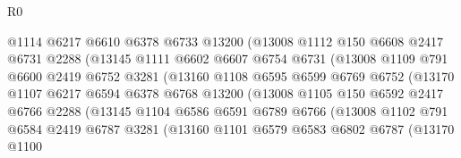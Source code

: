 \begin{lexlean}{R0}
\begin{coremodule}
                        @1114
                        @6217
                        @6610
                        @6378
                        @6733
                        @13200
                        (@13008
                          @1112
                          @150
                          @6608
                          @2417
                          @6731
                          @2288
                          (@13145
                            @1111
                            @6602
                            @6607
                            @6754
                            @6731
                            (@13008
                              @1109
                              @791
                              @6600
                              @2419
                              @6752
                              @3281
                              (@13160
                                @1108
                                @6595
                                @6599
                                @6769
                                @6752
                                (@13170
                                  @1107
                                  @6217
                                  @6594
                                  @6378
                                  @6768
                                  @13200
                                  (@13008
                                    @1105
                                    @150
                                    @6592
                                    @2417
                                    @6766
                                    @2288
                                    (@13145
                                      @1104
                                      @6586
                                      @6591
                                      @6789
                                      @6766
                                      (@13008
                                        @1102
                                        @791
                                        @6584
                                        @2419
                                        @6787
                                        @3281
                                        (@13160
                                          @1101
                                          @6579
                                          @6583
                                          @6802
                                          @6787
                                          (@13170
                                            @1100

\end{coremodule}
\end{lexlean}
